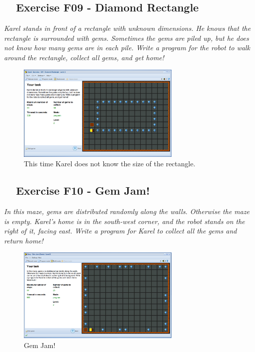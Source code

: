 \documentclass[article,A4,12pt]{llncs}
\begin{document}
{{{{\subsection{\ \ Exercise F09 - Diamond Rectangle}

{\em Karel stands in front of a rectangle with unknown dimensions. He knows that the rectangle is surrounded with gems. Sometimes the gems are piled up, but he does not know how many gems are in each pile. Write a program for the robot to walk around the rectangle, collect all gems, and get home!}

\newpage

\begin{figure}[!ht]
\begin{center}
\includegraphics[width=0.7\textwidth]{img/g04.png}
\end{center}
\vspace{-4mm}
\caption{This time Karel does not know the size of the rectangle.}
\label{fig:g04}
\vspace{-10mm}
\end{figure}
\noindent

\subsection{\ \ Exercise F10 - Gem Jam!}

{\em In this maze, gems are distributed randomly along the walls. Otherwise 
the maze is empty. Karel's home is in the south-west corner, and the robot 
stands on the right of it, facing east. Write a program for Karel to collect 
all the gems and return home!}

\begin{figure}[!ht]
\begin{center}
\includegraphics[width=0.7\textwidth]{img/g05.png}
\end{center}
\vspace{-4mm}
\caption{Gem Jam!}
\label{fig:g05}
\vspace{-10mm}
\end{figure}
\noindent

}}}}
\end{document}
